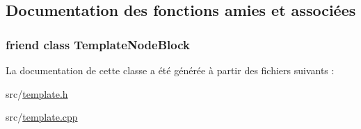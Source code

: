 \subsection{Documentation des fonctions amies et associées}
\hypertarget{class_template_engine_a593d2451d446162c730018cba7cf8687}{}
\subsubsection[{Template\+Node\+Block}]{\setlength{\rightskip}{0pt plus 5cm}friend class {\bf Template\+Node\+Block}\hspace{0.3cm}{\ttfamily [friend]}}\label{class_template_engine_a593d2451d446162c730018cba7cf8687}


La documentation de cette classe a été générée à partir des fichiers suivants \+:\begin{DoxyCompactItemize}
\item 
src/\hyperlink{template_8h}{template.\+h}\item 
src/\hyperlink{template_8cpp}{template.\+cpp}\end{DoxyCompactItemize}

